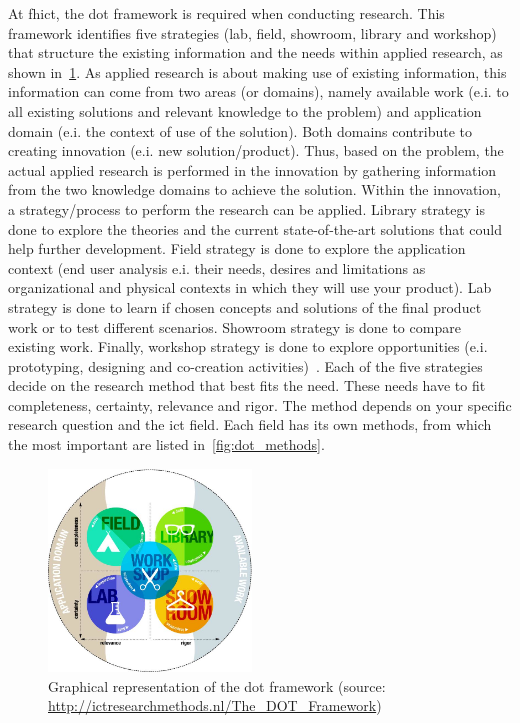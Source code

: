 At \acrshort{fhict}, the \acrfull{dot} framework is required when conducting research.
This framework identifies five strategies (lab, field, showroom, library and workshop) that structure the existing information and the needs within applied research, as shown in~\cref{fig:dot_framework}. 
As applied research is about making use of existing information, this information can come from two areas (or domains), namely available work (e.i. to all existing solutions and relevant knowledge to the problem) and application domain (e.i. the context of use of the solution).
Both domains contribute to creating innovation (e.i. new solution/product).
Thus, based on the problem, the actual applied research is performed in the innovation by gathering information from the two knowledge domains to achieve the solution.
Within the innovation, a strategy/process to perform the research can be applied.
Library strategy is done to explore the theories and the current state-of-the-art solutions that could help further development.
Field strategy is done to explore the application context (end user analysis e.i. their needs, desires and limitations as organizational and physical contexts in which they will use your product). 
Lab strategy is done to learn if chosen concepts and solutions of the final product work or to test different scenarios.
Showroom strategy is done to compare existing work.
Finally, workshop strategy is done to explore opportunities (e.i. prototyping, designing and co-creation activities)~\cite{dot}. Each of the five strategies decide on the research method that best fits the need. These needs have to fit completeness, certainty, relevance and rigor.
The method depends on your specific research question and the \acrshort{ict} field. 
Each field has its own methods, from which the most important are listed in~\cref{fig:dot_methods}.
\begin{figure}[h]
    \centering
    \includegraphics[width=0.48\textwidth]{figures/DOT-framework.png}
    \caption{Graphical representation of the \acrfull{dot} framework (source: \url{http://ictresearchmethods.nl/The_DOT_Framework})}
    \label{fig:dot_framework}
\end{figure}
